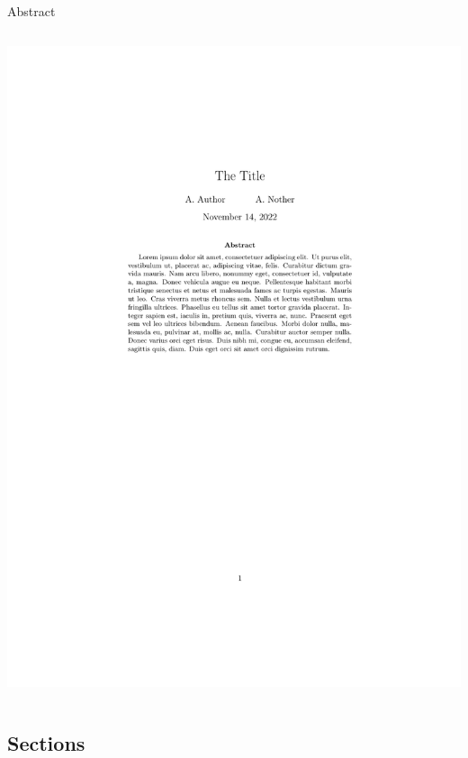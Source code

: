 \documentclass[,aspectratio=43]{beamer}
\begin{document}
\begin{frame}[fragile]{Abstract}
\begin{columns}[T]
\begin{column}{0.43\textwidth}
\begin{center}\includegraphics[width=1\linewidth]{figure/abstract} \end{center}
\end{column}
\end{columns}
\end{frame}

\hypertarget{sections}{%
\subsection{Sections}\label{sections}}
\end{document}
